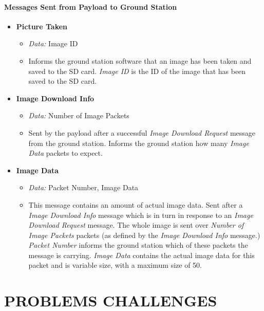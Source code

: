 \paragraph{Messages Sent from Payload to Ground Station}

\begin{itemize}

\item \textbf{Picture Taken}

\begin{itemize}
\item \emph{Data:} Image ID

\item Informs the ground station software that an image has been taken and 
saved to the SD card. \emph{Image ID} is the ID of the image that has been 
saved to the SD card.
\end{itemize} 

\item \textbf{Image Download Info}

\begin{itemize}

\item \emph{Data:} Number of Image Packets

\item Sent by the payload after a successful \emph{Image Download Request}
message from the ground station. Informs the ground station how many 
\emph{Image Data} packets to expect.
\end{itemize}

\item \textbf{Image Data} 
\begin{itemize}
\item \emph{Data:} Packet Number, Image Data
\item This message contains an amount of actual image data. Sent after a
\emph{Image Download Info} message which is in turn in response to an 
\emph{Image Download Request} message. The whole image is sent over
\emph{Number of Image Packets} packets (as defined by the \emph{Image Download
Info} message.) \emph{Packet Number} informs the ground station which of these
packets the message is carrying. \emph{Image Data} contains the actual image 
data for this packet and is variable size, with a maximum size of 50. 
\end{itemize}

\end{itemize}


\section{PROBLEMS CHALLENGES}